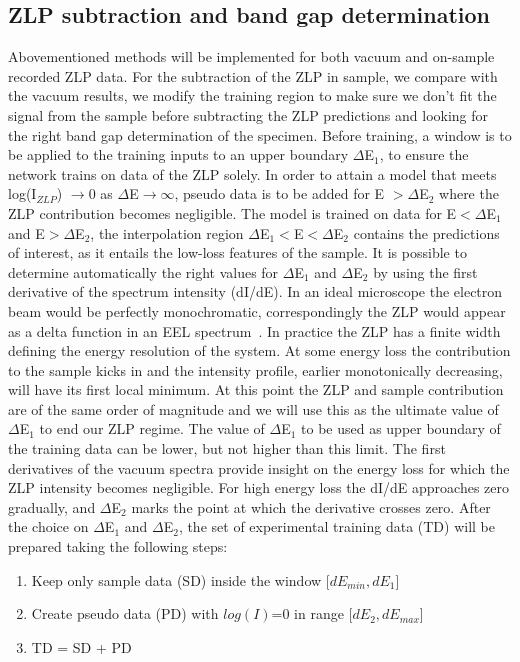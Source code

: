 \subsection{ZLP subtraction and band gap determination}
Abovementioned methods will be implemented for both vacuum and on-sample 
recorded ZLP data. For the subtraction of the ZLP in sample, 
we compare with the vacuum results, we modify the training region to make sure
we don't fit the signal from the sample before subtracting the ZLP predictions
and looking for the right band gap determination of the specimen.
%
Before training, a window is to be applied to the training inputs 
to an upper boundary $\Delta$E$_1$, to ensure the network trains 
on data of the ZLP solely. 
%
In order to attain a model that meets log(I$_{ZLP}$) $\rightarrow $0 
as $\Delta$E$\rightarrow \infty$, 
pseudo data is to be added for E $>\Delta$E$_2$ 
where the ZLP contribution becomes negligible. 
%
The model is trained on data for E$<\Delta$E$_1$ and E$>\Delta$E$_2$, 
the interpolation region $\Delta$E$_1<$E$<\Delta$E$_2$ contains 
the predictions of interest, as it entails the low-loss features 
of the sample. \newline
%
It is possible to determine automatically the right values for $\Delta$E$_1$
and $\Delta$E$_2$ by using the first derivative of the spectrum intensity (dI/dE).
%
In an ideal microscope the electron beam would be perfectly monochromatic, 
correspondingly the ZLP would appear as a delta function in an EEL spectrum~\cite{Rafferty:2000}.
%
In practice the ZLP has a finite width defining the energy resolution of the system. 
At some energy loss the contribution to the sample kicks in and the intensity profile, 
earlier monotonically decreasing, will have its first local minimum.
%
At this point the ZLP and sample contribution are of the same order of magnitude
and we will use this as the ultimate value of $\Delta$E$_1$ to end our
ZLP regime.
%
The value of $\Delta$E$_1$ to be used as upper boundary of the training data
can be lower, but not higher than this limit.\newline
%
The first derivatives of the vacuum spectra provide insight 
on the energy loss for which the ZLP intensity becomes negligible. For high
energy loss the dI/dE approaches zero gradually, and $\Delta$E$_2$ marks the
point at which the derivative crosses zero.
%
After the choice on $\Delta$E$_1$ and $\Delta$E$_2$, the set of experimental 
training data (TD) will be prepared taking the following steps:
\begin{enumerate}
    \item Keep only sample data (SD) inside the window [$dE_{min}, dE_1$]
    \item Create pseudo data (PD) with $log(I)$=0 in range [$dE_2, dE_{max}$]
    \item TD = SD + PD
\end{enumerate}
